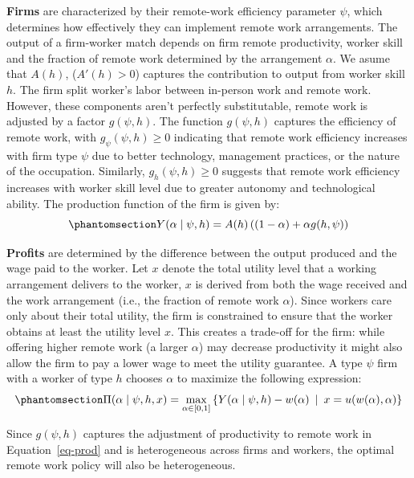 \documentclass[
  11pt,
  letterpaper,
  DIV=11,
  numbers=noendperiod]{scrartcl}
\theoremstyle{plain}
\theoremstyle{remark}
\begin{document}
\textbf{Firms} are characterized by their remote-work efficiency
parameter \(\psi\), which determines how effectively they can implement
remote work arrangements. The output of a firm-worker match depends on
firm remote productivity, worker skill and the fraction of remote work
determined by the arrangement \(\alpha\). We asume that \(A(h)\),
(\(A'(h) > 0\)) captures the contribution to output from worker skill
\(h\). The firm split worker's labor between in-person work and remote
work. However, these components aren't perfectly substitutable, remote
work is adjusted by a factor \(g(\psi, h)\). The function \(g(\psi, h)\)
captures the efficiency of remote work, with
\(g_{\psi}(\psi, h) \geq 0\) indicating that remote work efficiency
increases with firm type \(\psi\) due to better technology, management
practices, or the nature of the occupation. Similarly,
\(g_{h}(\psi, h) \geq 0\) suggests that remote work efficiency increases
with worker skill level due to greater autonomy and technological
ability. The production function of the firm is given by:
\begin{equation}\phantomsection\label{eq-prod}{Y(\alpha \mid \psi, h) = A(h)\left((1 - \alpha) + \alpha g(h,\psi)\right)}\end{equation}

\textbf{Profits} are determined by the difference between the output
produced and the wage paid to the worker. Let \(x\) denote the total
utility level that a working arrangement delivers to the worker, \(x\)
is derived from both the wage received and the work arrangement (i.e.,
the fraction of remote work \(\alpha\)). Since workers care only about
their total utility, the firm is constrained to ensure that the worker
obtains at least the utility level \(x\). This creates a trade-off for
the firm: while offering higher remote work (a larger \(\alpha\)) may
decrease productivity it might also allow the firm to pay a lower wage
to meet the utility guarantee. A type \(\psi\) firm with a worker of
type \(h\) chooses \(\alpha\) to maximize the following expression:
\begin{equation}\phantomsection\label{eq-firmProblem}{\Pi(\alpha \mid \psi, h, x)=\max_{\alpha\in[0,1]}\left\{Y(\alpha \mid \psi, h)-w(\alpha) \:\mid\: x=u(w(\alpha),\alpha)\right\}}\end{equation}

Since \(g(\psi, h)\) captures the adjustment of productivity to remote
work in Equation~\ref{eq-prod} and is heterogeneous across firms and
workers, the optimal remote work policy will also be heterogeneous.
\end{document}
